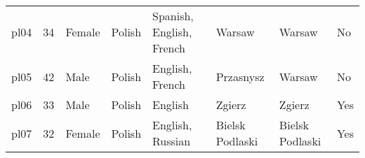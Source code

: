 \documentclass[]{JASAnew}
\begin{document}
\begin{table}[]
\begin{tabular}{llllllll}
pl04 & 34 & Female & Polish  & Spanish, English, French                  & Warsaw              & Warsaw          & No  \\
pl05 & 42 & Male   & Polish  & English, French                           & Przasnysz           & Warsaw        & No  \\
pl06 & 33 & Male   & Polish  & English                                   & Zgierz              & Zgierz          & Yes \\
pl07 & 32 & Female & Polish  & English, Russian                          & Bielsk Podlaski     & Bielsk Podlaski & Yes
\end{tabular}
\end{table}










\end{document}
